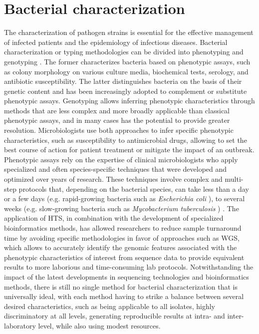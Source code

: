 \section{Bacterial characterization}

The characterization of pathogen strains is essential for the effective management of infected patients and the epidemiology of infectious diseases. Bacterial characterization or typing methodologies can be divided into phenotyping and genotyping \cite{li_bacterial_2009}. The former characterizes bacteria based on phenotypic assays, such as colony morphology on various culture media, biochemical tests, serology, and antibiotic susceptibility. The latter distinguishes bacteria on the basis of their genetic content and has been increasingly adopted to complement or substitute phenotypic assays. Genotyping allows inferring phenotypic characteristics through methods that are less complex and more broadly applicable than classical phenotypic assays, and in many cases has the potential to provide greater resolution. Microbiologists use both approaches to infer specific phenotypic characteristics, such as susceptibility to antimicrobial drugs, allowing to set the best course of action for patient treatment or mitigate the impact of an outbreak. Phenotypic assays rely on the expertise of clinical microbiologists who apply specialized and often species-specific techniques that were developed and optimized over years of research. These techniques involve complex and multi-step protocols that, depending on the bacterial species, can take less than a day or a few days (e.g. rapid-growing bacteria such as \textit{Escherichia coli} \cite{son_growth_2021}), to several weeks (e.g. slow-growing bacteria such as \textit{Mycobacterium tuberculosis} \cite{gordon_microbe_2018}) \cite{didelot_transforming_2012}. The application of \ac{HTS}, in combination with the development of specialized bioinformatics methods, has allowed researchers to reduce sample turnaround time by avoiding specific methodologies in favor of approaches such as \ac{WGS}, which allows to accurately identify the genomic features associated with the phenotypic characteristics of interest from sequence data to provide equivalent results to more laborious and time-consuming lab protocols. Notwithstanding the impact of the latest developments in sequencing technologies and bioinformatics methods, there is still no single method for bacterial characterization that is universally ideal, with each method having to strike a balance between several desired characteristics, such as being applicable to all isolates, highly discriminatory at all levels, generating reproducible results at intra- and inter-laboratory level, while also using modest resources.

